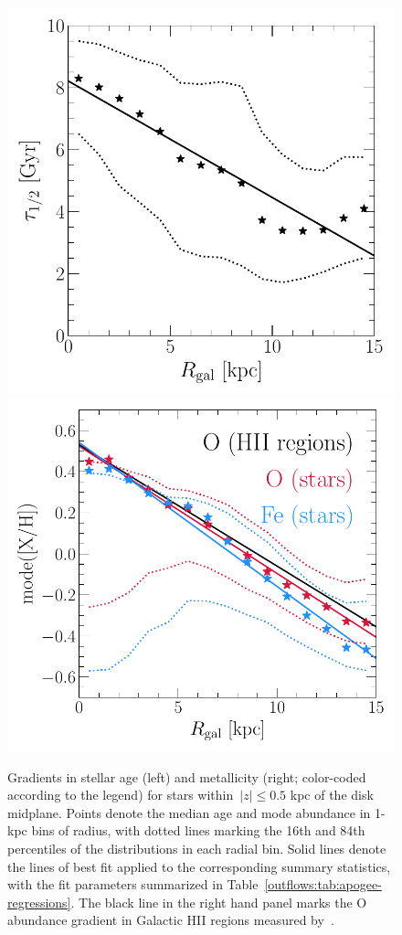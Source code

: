 \begin{figure}
\centering
\includegraphics[scale = 0.51]{age_gradient.pdf}
\includegraphics[scale = 0.5]{gradxh.pdf}
\caption{
Gradients in stellar age (left) and metallicity (right; color-coded according
to the legend) for stars within~$\left|z\right| \leq 0.5$ kpc of the disk
midplane.
Points denote the median age and mode abundance in 1-kpc bins of radius, with
dotted lines marking the 16th and 84th percentiles of the distributions in each
radial bin.
Solid lines denote the lines of best fit applied to the corresponding summary
statistics, with the fit parameters summarized in
Table~\ref{outflows:tab:apogee-regressions}.
The black line in the right hand panel marks the O abundance gradient in
Galactic HII regions measured by~\citet{MendezDelgado2022}.
}
\label{outflows:fig:gradxh-gradage}
\end{figure}

